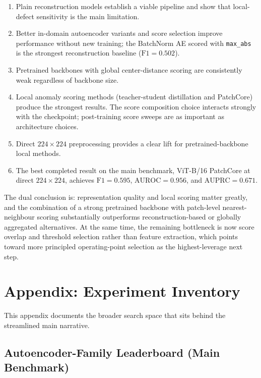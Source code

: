 \documentclass[11pt]{article}
\begin{document}
\begin{enumerate}[leftmargin=1.5em]
  \item Plain reconstruction models establish a viable pipeline and show that
        local-defect sensitivity is the main limitation.
  \item Better in-domain autoencoder variants and score selection improve
        performance without new training; the BatchNorm AE scored with
        \texttt{max\_abs} is the strongest reconstruction baseline
        ($\mathrm{F1}=0.502$).
  \item Pretrained backbones with global center-distance scoring are consistently
        weak regardless of backbone size.
  \item Local anomaly scoring methods (teacher-student distillation and
        PatchCore) produce the strongest results. The score composition
        choice interacts strongly with the checkpoint; post-training score
        sweeps are as important as architecture choices.
  \item Direct $224\!\times\!224$ preprocessing provides a clear lift for
        pretrained-backbone local methods.
  \item The best completed result on the main benchmark, ViT-B/16 PatchCore at
        direct $224\!\times\!224$, achieves $\mathrm{F1}=0.595$,
        $\mathrm{AUROC}=0.956$, and $\mathrm{AUPRC}=0.671$.
\end{enumerate}

The dual conclusion is: representation quality and local scoring matter
greatly, and the combination of a strong pretrained backbone with patch-level
nearest-neighbour scoring substantially outperforms reconstruction-based
or globally aggregated alternatives.  At the same time, the remaining
bottleneck is now score overlap and threshold selection rather than feature
extraction, which points toward more principled operating-point selection as
the highest-leverage next step.

\appendix
\newpage
\section{Appendix: Experiment Inventory}

This appendix documents the broader search space that sits behind the
streamlined main narrative.

\subsection{Autoencoder-Family Leaderboard (Main Benchmark)}
\end{document}
